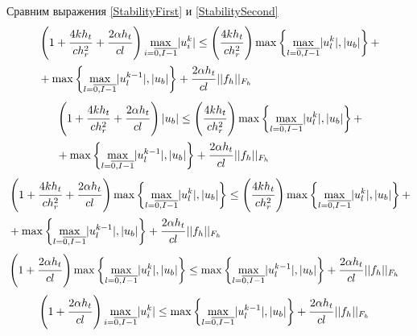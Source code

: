 \documentclass[a4paper,12pt,russian, fleqn]{extreport}
\begin{document}
	Сравним выражения \eqref{StabilityFirst} и \eqref{StabilitySecond}
	\begin{align}
		& \left( 1 + \dfrac{\strut 4kh_t}{\strut ch_r^2} + \dfrac{\strut 2\alpha h_t}{\strut cl} \right)\max\limits_{i=\overline{0,I-1}}\lvert u^k_i\rvert \leq \left(\dfrac{\strut 4kh_t}{\strut ch_r^2}\right) \max\left\{\max\limits_{l = \overline{0, I-1}}\lvert u_l^k \rvert, \lvert u_b \rvert \right\} + \nonumber \\
		& + \max\left\{\max\limits_{l = \overline{0, I-1}}\lvert u_l^{k-1} \rvert, \lvert u_b \rvert \right\} + \dfrac{\strut 2\alpha h_t}{\strut cl} \lvert\lvert f_h \rvert\rvert_{F_h} \nonumber
	\end{align}
	\begin{align}
		& \left( 1 + \dfrac{\strut 4kh_t}{\strut ch_r^2} + \dfrac{\strut 2\alpha h_t}{\strut cl} \right)
		\lvert u_b \rvert \leq \left(\dfrac{\strut 4kh_t}{\strut ch_r^2}\right) \max\left\{\max\limits_{l = \overline{0, I-1}}\lvert u_l^k \rvert, \lvert u_b \rvert \right\} + \nonumber \\
		& + \max\left\{\max\limits_{l = \overline{0, I-1}}\lvert u_l^{k-1} \rvert, \lvert u_b \rvert \right\} + \dfrac{\strut 2\alpha h_t}{\strut cl} \lvert\lvert f_h \rvert\rvert_{F_h} \nonumber
	\end{align}
	\begin{align}
		& \left( 1 + \dfrac{\strut 4kh_t}{\strut ch_r^2} + \dfrac{\strut 2\alpha h_t}{\strut cl} \right)\max\left\{\max\limits_{l = \overline{0, I-1}}\lvert u_l^k \rvert, \lvert u_b \rvert \right\} \leq \left(\dfrac{\strut 4kh_t}{\strut ch_r^2}\right) \max\left\{\max\limits_{l = \overline{0, I-1}}\lvert u_l^k \rvert, \lvert u_b \rvert \right\} + \nonumber \\
		& + \max\left\{\max\limits_{l = \overline{0, I-1}}\lvert u_l^{k-1} \rvert, \lvert u_b \rvert \right\} + \dfrac{\strut 2\alpha h_t}{\strut cl} \lvert\lvert f_h \rvert\rvert_{F_h} \nonumber
	\end{align}
	\begin{align}
	& \left( 1 + \dfrac{\strut 2\alpha h_t}{\strut cl} \right)\max\left\{\max\limits_{l = \overline{0, I-1}}\lvert u_l^k \rvert, \lvert u_b \rvert \right\} \leq  \max\left\{\max\limits_{l = \overline{0, I-1}}\lvert u_l^{k-1} \rvert, \lvert u_b \rvert \right\} + \dfrac{\strut 2\alpha h_t}{\strut cl} \lvert\lvert f_h \rvert\rvert_{F_h} \nonumber
	\end{align}
	\begin{align}
		& \left( 1 + \dfrac{\strut 2\alpha h_t}{\strut cl} \right) \max\limits_{i=\overline{0,I-1}} \lvert u_i^k \rvert \leq  \max\left\{\max\limits_{l = \overline{0, I-1}}\lvert u_l^{k-1} \rvert, \lvert u_b \rvert \right\} + \dfrac{\strut 2\alpha h_t}{\strut cl} \lvert\lvert f_h \rvert\rvert_{F_h} \nonumber
	\end{align}
	
\end{document}
